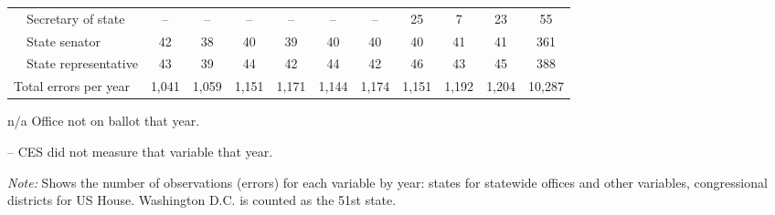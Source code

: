 \begin{table}[!htbp]
{\begin{threeparttable}
\begin{tabular}{lcccccccccc}
~~Secretary of state & -- & -- & -- & -- & -- & -- & 25 & 7 & 23 & 55 \\
~~State senator & 42 & 38 & 40 & 39 & 40 & 40 & 40 & 41 & 41 & 361 \\
~~State representative & 43 & 39 & 44 & 42 & 44 & 42 & 46 & 43 & 45 & 388 \\
\midrule
Total errors per year & 1,041 & 1,059 & 1,151 & 1,171 & 1,144 & 1,174 & 1,151 & 1,192 & 1,204 & 10,287 \\
\bottomrule
\end{tabular}
\begin{tablenotes}
\footnotesize
\item n/a Office not on ballot that year.
\item -- CES did not measure that variable that year.
\item \textit{Note:} Shows the number of observations (errors) for each variable by year: states for statewide offices and other variables, congressional districts for US House. Washington D.C. is counted as the 51st state.
\end{tablenotes}
\end{threeparttable}%
}
\end{table}